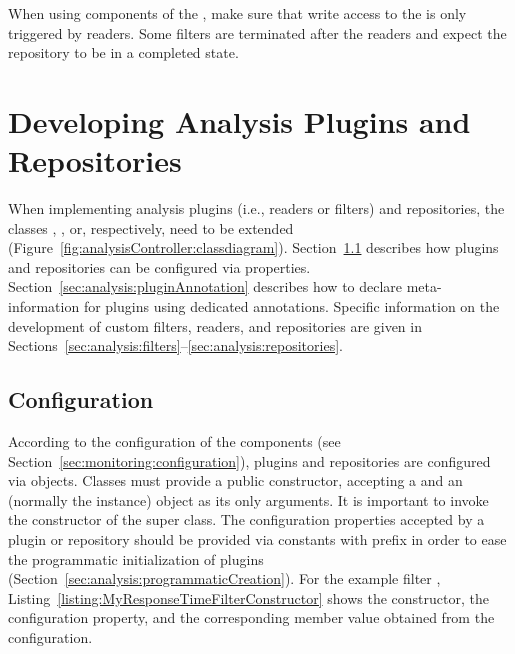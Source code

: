 When using components of the \KiekerTraceAnalysis{}, make sure that write access to the %
 is only triggered by readers. Some filters are terminated %
after the readers and expect the repository to be in a completed state.


\section{Developing Analysis Plugins and Repositories}\label{sec:analysis:plugins}

When implementing analysis plugins (i.e., readers or filters) and repositories, %
the classes , , or, %
respectively,  need to be extended %
(Figure~\ref{fig:analysisController:classdiagram}). %
Section~\ref{sec:analysis:configuration} describes how plugins and repositories %
can be configured via properties. %
Section~\ref{sec:analysis:pluginAnnotation} %
describes how to declare meta-information for plugins using %
dedicated annotations. %
Specific information on the development of custom filters, readers, and repositories %
are given in Sections~\ref{sec:analysis:filters}--\ref{sec:analysis:repositories}. %


\subsection{Configuration}\label{sec:analysis:configuration}

\noindent According to the %
configuration of the \KiekerMonitoringPart{} components (see Section~\ref{sec:monitoring:configuration}),
plugins and repositories are configured via  objects. Classes must %
provide a public constructor, accepting a  and an  (normally the  instance) object as %
its only arguments. It is important to invoke the constructor of the super class. %
The configuration properties accepted by a plugin or repository should be provided via  %
constants with prefix  in order to ease the %
programmatic initialization of plugins (Section~\ref{sec:analysis:programmaticCreation}). %
For the example filter ,
Listing~\ref{listing:MyResponseTimeFilterConstructor} shows the constructor,
the configuration property, and the corresponding member value obtained from the %
configuration.

